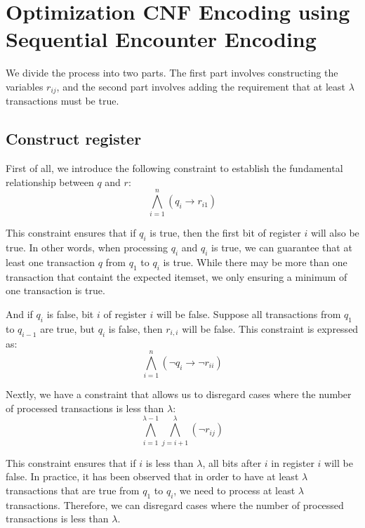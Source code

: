 \section{Optimization CNF Encoding using Sequential Encounter Encoding}

We divide the process into two parts. The first part involves constructing the variables $r_{ij}$,
and the second part involves adding the requirement that at least $\lambda$ transactions must be true.
\subsection{Construct register}

First of all, we introduce the following constraint to establish the fundamental relationship between $q$ and $r$:
\begin{equation}
    \bigwedge_{i=1}^{n} \left( q_i \rightarrow r_{i1} \right)
\end{equation}

This constraint ensures that if $q_i$ is true, then the first bit of register $i$ will also be true. In other words, when processing $q_i$ and $q_i$ is true,
we can guarantee that at least one transaction $q$ from $q_1$ to $q_i$ is true.
While there may be more than one transaction that containt the expected itemset, we only ensuring a minimum of one transaction is true.

And if $q_i$ is false, bit $i$ of register $i$ will be false.
Suppose all transactions from $q_1$ to $q_{i-1}$ are true, but $q_i$ is false, then $r_{i,i}$ will be false.
This constraint is expressed as:
\begin{equation}
    \bigwedge_{i=1}^{n} \left( \neg q_i \rightarrow \neg r_{ii} \right)
\end{equation}


Nextly, we have a constraint that allows us to disregard cases where the number of processed transactions is less than $\lambda$:
\begin{equation}
    \bigwedge_{i=1}^{\lambda-1} \bigwedge_{j=i+1}^{\lambda} \left( \neg r_{ij} \right)
\end{equation}

This constraint ensures that if $i$ is less than $\lambda$, all bits after $i$ in register $i$ will be false.
In practice, it has been observed that in order to have at least $\lambda$ transactions that are true from $q_1$ to $q_i$,
we need to process at least $\lambda$ transactions.
Therefore, we can disregard cases where the number of processed transactions is less than $\lambda$.

